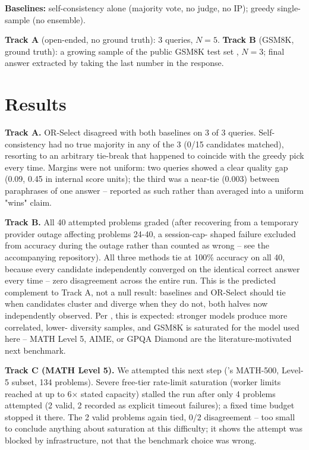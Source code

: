 \documentclass{article}
\begin{document}
\textbf{Baselines:} self-consistency alone (majority vote, no judge, no
IP); greedy single-sample (no ensemble).

\textbf{Track A} (open-ended, no ground truth): 3 queries, $N=5$.
\textbf{Track B} (GSM8K, ground truth): a growing sample of the public
GSM8K test set \citep{wang2023selfconsistency}, $N=3$; final answer
extracted by taking the last number in the response.

\section{Results}

\textbf{Track A.} OR-Select disagreed with both baselines on 3 of 3
queries. Self-consistency had no true majority in any of the 3 (0/15
candidates matched), resorting to an arbitrary tie-break that happened to
coincide with the greedy pick every time. Margins were not uniform: two
queries showed a clear quality gap (0.09, 0.45 in internal score units);
the third was a near-tie (0.003) between paraphrases of one answer --
reported as such rather than averaged into a uniform "wins" claim.

\textbf{Track B.} All 40 attempted problems graded (after recovering from
a temporary provider outage affecting problems 24-40, a session-cap-
shaped failure excluded from accuracy during the outage rather than
counted as wrong -- see the accompanying repository). All three methods
tie at 100\% accuracy on all 40, because every candidate independently
converged on the identical correct answer every time -- zero
disagreement across the entire run. This is the predicted complement to
Track A, not a null result: baselines and OR-Select should tie when
candidates cluster and diverge when they do not, both halves now
independently observed. Per \citet{kim2025correlated,ding2026agree},
this is expected: stronger models produce more correlated, lower-
diversity samples, and GSM8K is saturated for the model used here --
MATH Level 5, AIME, or GPQA Diamond are the literature-motivated next
benchmark.

\textbf{Track C (MATH Level 5).} We attempted this next step
(\citet{lightman2023letsverify}'s MATH-500, Level-5 subset, 134
problems). Severe free-tier rate-limit saturation (worker limits reached
at up to 6$\times$ stated capacity) stalled the run after only 4
problems attempted (2 valid, 2 recorded as explicit timeout failures); a
fixed time budget stopped it there. The 2 valid problems again tied,
0/2 disagreement -- too small to conclude anything about saturation at
this difficulty; it shows the attempt was blocked by infrastructure, not
that the benchmark choice was wrong.
\end{document}
